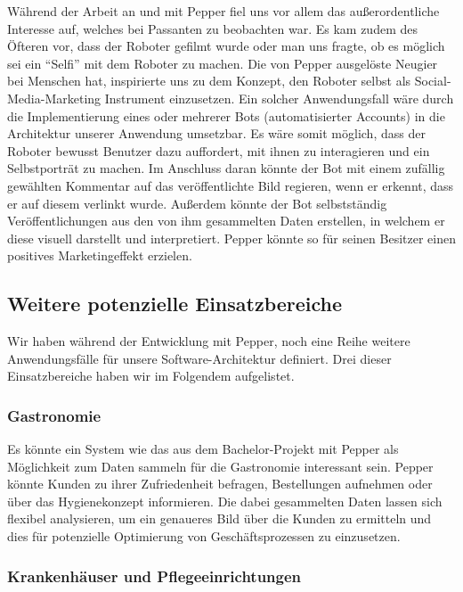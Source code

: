 Während der Arbeit an und mit Pepper fiel uns vor allem das außerordentliche Interesse auf, welches bei Passanten zu beobachten war. Es kam zudem des Öfteren vor, dass der Roboter gefilmt wurde oder man uns fragte, ob es möglich sei ein “Selfi” mit dem Roboter zu machen. Die von Pepper ausgelöste Neugier bei Menschen hat, inspirierte uns zu dem Konzept, den Roboter selbst als Social-Media-Marketing Instrument einzusetzen.
Ein solcher Anwendungsfall wäre durch die Implementierung eines oder mehrerer Bots (automatisierter Accounts) in die Architektur unserer Anwendung umsetzbar. Es wäre somit möglich, dass der Roboter bewusst Benutzer dazu auffordert, mit ihnen zu interagieren und ein Selbstporträt zu machen. Im Anschluss daran könnte der Bot mit einem zufällig gewählten Kommentar auf das veröffentlichte Bild regieren, wenn er erkennt, dass er auf diesem verlinkt wurde. Außerdem könnte der Bot selbstständig Veröffentlichungen aus den von ihm gesammelten Daten erstellen, in welchem er diese visuell darstellt und interpretiert. Pepper könnte so für seinen Besitzer einen positives Marketingeffekt erzielen.

\subsection{Weitere potenzielle Einsatzbereiche}

Wir haben während der Entwicklung mit Pepper, noch eine Reihe weitere Anwendungsfälle für unsere Software-Architektur definiert. Drei dieser Einsatzbereiche haben wir im Folgendem aufgelistet.

\subsubsection{Gastronomie}

Es könnte ein System wie das aus dem Bachelor-Projekt mit Pepper als Möglichkeit zum Daten sammeln für die Gastronomie interessant sein. Pepper könnte Kunden zu ihrer Zufriedenheit befragen, Bestellungen aufnehmen oder über das Hygienekonzept informieren. Die dabei gesammelten Daten lassen sich flexibel analysieren, um ein genaueres Bild über die Kunden zu ermitteln und dies für potenzielle Optimierung von Geschäftsprozessen zu einzusetzen.

\subsubsection{Krankenhäuser und Pflegeeinrichtungen}

